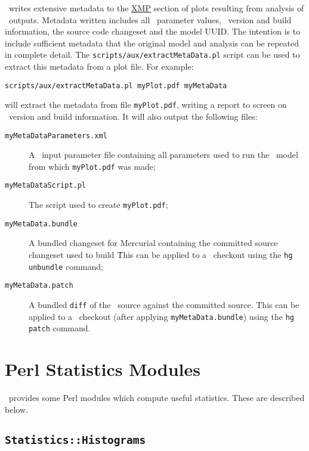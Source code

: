 \glc\ writes extensive metadata to the \href{http://en.wikipedia.org/wiki/Extensible_Metadata_Platform}{XMP} section of plots resulting from analysis of \glc\ outputs. Metadata written includes all \glc\ parameter values, \glc\ version and build information, the source code changeset and the model \gls{UUID}. The intention is to include sufficient metadata that the original model and analysis can be repeated in complete detail. The {\tt scripts/aux/extractMetaData.pl} script can be used to extract this metadata from a plot file. For example:
\begin{verbatim}
scripts/aux/extractMetaData.pl myPlot.pdf myMetaData
\end{verbatim}
will extract the metadata from file {\tt myPlot.pdf}, writing a report to screen on \glc\ version and build information. It will also output the following files:
\begin{description}
\item[{\tt myMetaDataParameters.xml}] A \glc\ input parameter file containing all parameters used to run the \glc\ model from which {\tt myPlot.pdf} was made;
\item[{\tt myMetaDataScript.pl}] The script used to create {\tt myPlot.pdf};
\item[{\tt myMetaData.bundle}] A bundled changeset for Mercurial containing the committed source changeset used to build \glc\. This can be applied to a \glc\ checkout using the {\tt hg unbundle} command;
\item[{\tt myMetaData.patch}] A bundled {\tt diff} of the \glc\ source against the committed source. This can be applied to a \glc\ checkout (after applying {\tt myMetaData.bundle}) using the {\tt hg patch} command.
\end{description}

\section{Perl Statistics Modules}

\glc\ provides some Perl modules which compute useful statistics. These are described below.

\subsection{{\tt Statistics::Histograms}}

